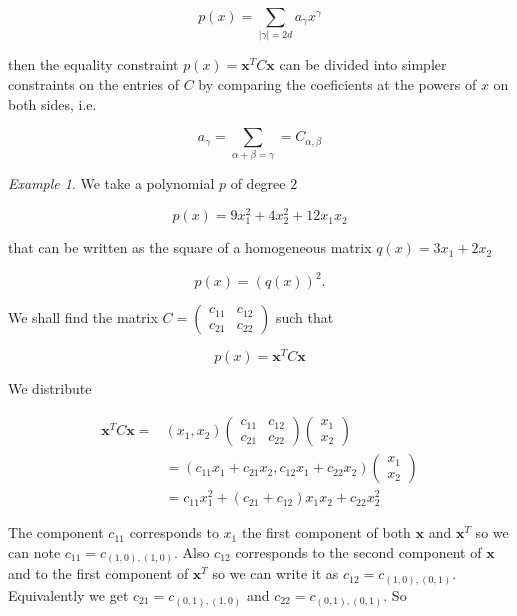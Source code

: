 \documentclass[onecolumn,11pt,a4paper]{article}
\theoremstyle{plain}  %
\theoremstyle{remark}  %
\newtheorem{example}[theorem]{Example}
\begin{document}
	\[
		p(x) = \sum_{|\gamma| = 2d} a_\gamma x^\gamma
	\]
	
	then the equality constraint $p(x) = \mathbf{x}^T C \mathbf{x}$ can be divided into
	simpler constraints on the entries of $C$ by comparing the coeficients at the
	powers of $x$ on both sides, i.e.

	\[
		a_\gamma = \sum_{\alpha + \beta = \gamma} = C_{\alpha, \beta}
	\]

	\begin{example}
		We take a polynomial $p$ of degree $2$ 
	
		\begin{equation*}
			p (x) = 9x_1^2 + 4 x_2^2 + 12 x_1 x_2  
		\end{equation*}

that can be written as the square of a homogeneous matrix $q(x) =  3 x_1 + 2 x_2 $

\begin{equation*}
	p(x) = \left( q(x) \right)^2.
\end{equation*}

We shall find the matrix $ C = \begin{pmatrix}c_{11} & c_{12} \\ c_{21} & c_{22}
\end{pmatrix} $ such that 

\begin{equation*}
	p(x) = \mathbf{x}^T C \mathbf{x}
\end{equation*}

We distribute 

\begin{align*}
	\mathbf{x}^T C \mathbf{x} = & \left( x_1, x_2 \right) \begin{pmatrix}c_{11} & c_{12} \\ c_{21} & c_{22}
	\end{pmatrix} \begin{pmatrix}x_{1} \\ x_{2} \end{pmatrix} \\
	& = \left( c_{11} x_1 + c_{21} x_2, c_{12} x_1 + c_{22} x_2 \right)
	\begin{pmatrix}x_{1} \\ x_{2} \end{pmatrix}  \\
	& = c_{11} x_1^2 + \left( c_{21} + c_{12} \right) x_1 x_2 + c_{22} x_2^2
\end{align*}

The component $c_{11}$ corresponds to $x_1$ the first component of both $\mathbf{x}$
and $\mathbf{x}^T$ so we can note $c_{11} = c_{(1, 0),(1, 0)}$. Also $c_{12}$ corresponds to the second component of $\mathbf{x}$ and to the
first component of $\mathbf{x}^T$ so we can write it as $c_{12} = c_{(1,
0),(0,1)}$. Equivalently we get $c_{21} = c_{(0, 1),(1, 0)} $ and $ c_{22} = c_{(0, 1),(0, 1)}$. So 


\end{example}
\end{document}
